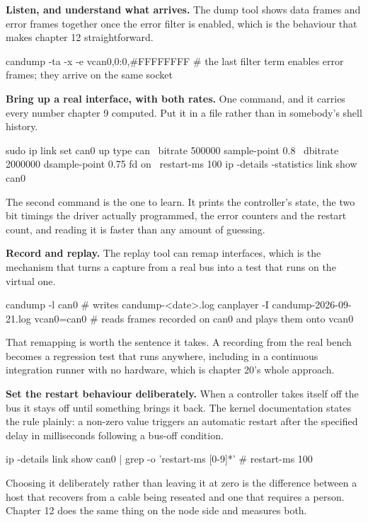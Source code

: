 \begin{steps}
\item \textbf{Listen, and understand what arrives.} The dump tool shows data
frames and error frames together once the error filter is enabled, which is the
behaviour that makes chapter 12 straightforward.
\begin{shellcode}
candump -ta -x -e vcan0,0:0,#FFFFFFFF
# the last filter term enables error frames; they arrive on the same socket
\end{shellcode}


\item \textbf{Bring up a real interface, with both rates.} One command, and it
carries every number chapter 9 computed. Put it in a file rather than in
somebody's shell history.
\begin{shellcode}
sudo ip link set can0 up type can \
     bitrate 500000 sample-point 0.8 \
     dbitrate 2000000 dsample-point 0.75 fd on \
     restart-ms 100
ip -details -statistics link show can0
\end{shellcode}
The second command is the one to learn. It prints the controller's state, the
two bit timings the driver actually programmed, the error counters and the
restart count, and reading it is faster than any amount of guessing.

\item \textbf{Record and replay.} The replay tool can remap interfaces, which is
the mechanism that turns a capture from a real bus into a test that runs on the
virtual one.
\begin{shellcode}
candump -l can0                       # writes candump-<date>.log
canplayer -I candump-2026-09-21.log vcan0=can0
# reads frames recorded on can0 and plays them onto vcan0
\end{shellcode}
That remapping is worth the sentence it takes. A recording from the real bench
becomes a regression test that runs anywhere, including in a continuous
integration runner with no hardware, which is chapter 20's whole approach.

\item \textbf{Set the restart behaviour deliberately.} When a controller takes
itself off the bus it stays off until something brings it back. The kernel
documentation states the rule plainly: a non-zero value triggers an automatic
restart after the specified delay in milliseconds following a bus-off condition.
\begin{shellcode}
ip -details link show can0 | grep -o 'restart-ms [0-9]*'
# restart-ms 100
\end{shellcode}
Choosing it deliberately rather than leaving it at zero is the difference
between a host that recovers from a cable being reseated and one that requires a
person. Chapter 12 does the same thing on the node side and measures both.


\end{steps}
